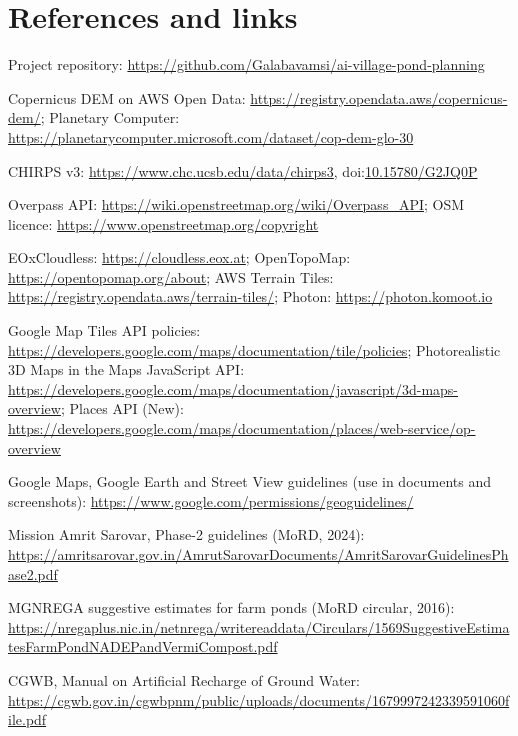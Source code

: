 \documentclass[11pt,a4paper]{article}
\begin{document}
\section*{References and links}
\begin{enumerate}[label={[\arabic*]},ref={\arabic*},leftmargin=*]
\item\label{ref:repo} Project repository: \url{https://github.com/Galabavamsi/ai-village-pond-planning}
\item\label{ref:glo30} Copernicus DEM on AWS Open Data: \url{https://registry.opendata.aws/copernicus-dem/}; Planetary Computer: \url{https://planetarycomputer.microsoft.com/dataset/cop-dem-glo-30}
\item\label{ref:chirps} CHIRPS v3: \url{https://www.chc.ucsb.edu/data/chirps3}, doi:\href{https://doi.org/10.15780/G2JQ0P}{10.15780/G2JQ0P}
\item\label{ref:overpass} Overpass API: \url{https://wiki.openstreetmap.org/wiki/Overpass_API}; OSM licence: \url{https://www.openstreetmap.org/copyright}
\item\label{ref:eox} EOxCloudless: \url{https://cloudless.eox.at}; OpenTopoMap: \url{https://opentopomap.org/about}; AWS Terrain Tiles: \url{https://registry.opendata.aws/terrain-tiles/}; Photon: \url{https://photon.komoot.io}
\item\label{ref:google} Google Map Tiles API policies: \url{https://developers.google.com/maps/documentation/tile/policies}; Photorealistic 3D Maps in the Maps JavaScript API: \url{https://developers.google.com/maps/documentation/javascript/3d-maps-overview}; Places API (New): \url{https://developers.google.com/maps/documentation/places/web-service/op-overview}
\item\label{ref:geoguide} Google Maps, Google Earth and Street View guidelines (use in documents and screenshots): \url{https://www.google.com/permissions/geoguidelines/}
\item\label{ref:amrit} Mission Amrit Sarovar, Phase-2 guidelines (MoRD, 2024): \url{https://amritsarovar.gov.in/AmrutSarovarDocuments/AmritSarovarGuidelinesPhase2.pdf}
\item\label{ref:mgnrega} MGNREGA suggestive estimates for farm ponds (MoRD circular, 2016): \url{https://nregaplus.nic.in/netnrega/writereaddata/Circulars/1569SuggestiveEstimatesFarmPondNADEPandVermiCompost.pdf}
\item\label{ref:cgwb} CGWB, Manual on Artificial Recharge of Ground Water: \url{https://cgwb.gov.in/cgwbpnm/public/uploads/documents/1679997242339591060file.pdf}

\end{enumerate}
\end{document}
